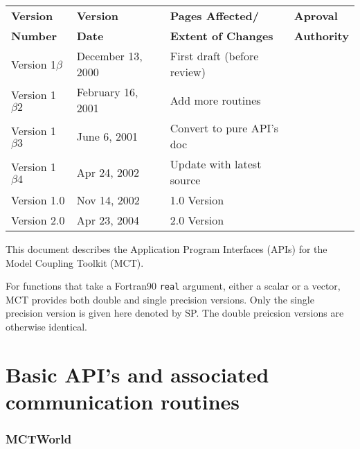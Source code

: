\documentclass{article}
\begin{document}
\begin{center}
\begin{tabular}{|l|l|l|l|}\hline
{\bf Version} & {\bf Version} & {\bf Pages Affected/}   & {\bf Aproval}\\
{\bf Number}  & {\bf Date}    & {\bf Extent of Changes} & {\bf Authority}\\
\hline
\hline 
Version 1$\beta$ & December 13, 2000      & First draft (before review) &
\\\hline
Version 1$\beta2$ & February 16, 2001      & Add more routines &
\\\hline
Version 1$\beta3$ & June 6, 2001      & Convert to pure API's doc &
\\\hline
Version 1$\beta4$ & Apr 24, 2002      & Update with latest source &
\\\hline
Version 1.0 & Nov 14, 2002      & 1.0 Version &
\\\hline
Version 2.0 & Apr 23, 2004      & 2.0 Version &
\\\hline
\end{tabular}
\end{center}

\vspace*{\fill}


\newpage
\setcounter{page}{3}     %

\vspace*{\fill}

This document describes the Application Program Interfaces (APIs)
for the Model Coupling Toolkit (MCT).

For functions that take a Fortran90 {\tt real} argument, either a scalar or
a vector, MCT provides both double and single precision versions.  Only
the single precision version is given here denoted by SP.  The double preicsion versions
are otherwise identical.

\vspace*{\fill}
\newpage

\tableofcontents
\newpage



\part{Basic API's and associated communication routines}
%
\section{MCTWorld}

%
\end{document}
